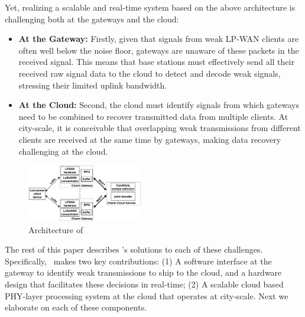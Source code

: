 Yet, realizing a scalable and real-time system based on the above architecture is challenging both at the gateways and the cloud: 
\begin{itemize}
\item {\bf At the Gateway: } Firstly, given that signals from weak LP-WAN clients are often well below the noise floor, gateways are unaware of these packets in the received signal. This means that base stations must effectively send all their received raw signal data to the cloud to detect and decode weak signals, stressing their limited uplink bandwidth. 
\item {\bf At the Cloud: } Second, the cloud must identify signals from which gateways need to be combined to recover transmitted data from multiple clients. At city-scale, it is  conceivable that overlapping weak transmissions from different clients are received at the same time by gateways, making data recovery challenging at the cloud.
\end{itemize}


\begin{figure}[!htb]
    \centering
    \includegraphics[width=0.45\textwidth]{figures/charm-architecture_cropped.pdf}
    \caption{Architecture of \name}
    \label{fig:architecture}
    \compactimg
\end{figure}


 The rest of this paper describes \name's solutions to each of these challenges. Specifically, \name\ makes two key contributions: (1) A software interface at the gateway to identify weak transmissions to ship to the cloud, and a hardware design that facilitates these decisions in real-time; (2) A scalable cloud based PHY-layer processing system at the cloud that operates at city-scale. Next we elaborate on each of these components. 





